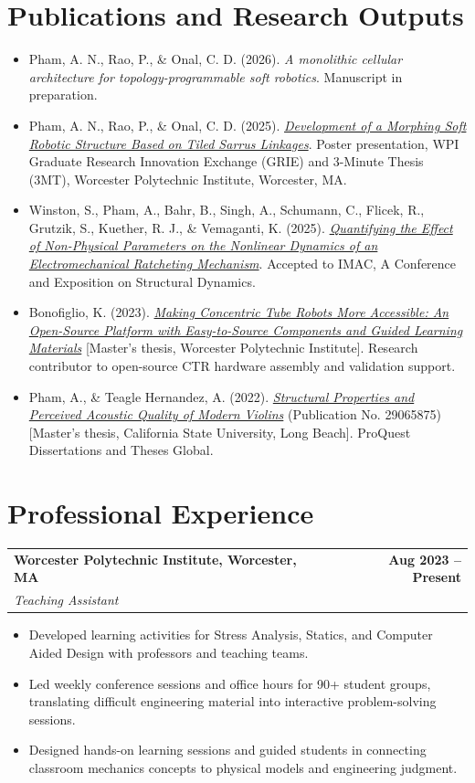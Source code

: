 \documentclass[10pt,letterpaper]{article}
\makeatletter
\newcommand{\roleentry}[4]{%
  \begin{tabularx}{\textwidth}{@{}>{\raggedright\arraybackslash}X r@{}}
    \textbf{#1} & \textbf{#2}\\
    \textit{\textcolor{muted}{#3}} & \textit{\textcolor{muted}{#4}}
  \end{tabularx}
  \vspace{-2pt}
}
\makeatother
\begin{document}
\section*{Publications and Research Outputs}
\begin{itemize}
  \item Pham, A. N., Rao, P., \& Onal, C. D. (2026). \textit{A monolithic cellular architecture for topology-programmable soft robotics}. Manuscript in preparation.
  \item Pham, A. N., Rao, P., \& Onal, C. D. (2025). \href{https://www.wpi.edu/news/calendar/events/2025-graduate-research-innovation-exchange-grie-3-minute-thesis-two-exceptional-events-one-inspiring}{\textit{Development of a Morphing Soft Robotic Structure Based on Tiled Sarrus Linkages}}. Poster presentation, WPI Graduate Research Innovation Exchange (GRIE) and 3-Minute Thesis (3MT), Worcester Polytechnic Institute, Worcester, MA.
  \item Winston, S., Pham, A., Bahr, B., Singh, A., Schumann, C., Flicek, R., Grutzik, S., Kuether, R. J., \& Vemaganti, K. (2025). \href{https://aolabs.io/sandia/paper.pdf}{\textit{Quantifying the Effect of Non-Physical Parameters on the Nonlinear Dynamics of an Electromechanical Ratcheting Mechanism}}. Accepted to IMAC, A Conference and Exposition on Structural Dynamics.
  \item Bonofiglio, K. (2023). \href{https://digital.wpi.edu/pdfviewer/ms35td790}{\textit{Making Concentric Tube Robots More Accessible: An Open-Source Platform with Easy-to-Source Components and Guided Learning Materials}} [Master's thesis, Worcester Polytechnic Institute]. Research contributor to open-source CTR hardware assembly and validation support.
  \item Pham, A., \& Teagle Hernandez, A. (2022). \href{https://www.proquest.com/docview/2718992967}{\textit{Structural Properties and Perceived Acoustic Quality of Modern Violins}} (Publication No. 29065875) [Master's thesis, California State University, Long Beach]. ProQuest Dissertations and Theses Global.
\end{itemize}

\section*{Professional Experience}
\roleentry{Worcester Polytechnic Institute, Worcester, MA}{Aug 2023 -- Present}{Teaching Assistant}{}
\begin{itemize}
  \item Developed learning activities for Stress Analysis, Statics, and Computer Aided Design with professors and teaching teams.
  \item Led weekly conference sessions and office hours for 90+ student groups, translating difficult engineering material into interactive problem-solving sessions.
  \item Designed hands-on learning sessions and guided students in connecting classroom mechanics concepts to physical models and engineering judgment.
\end{itemize}
\end{document}
